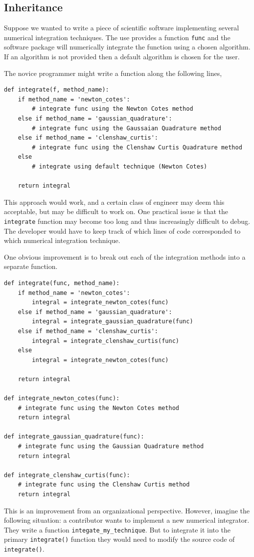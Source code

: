 \subsection{Inheritance}

Suppose we wanted to write a piece of scientific software implementing several
numerical integration techniques. The use provides a function {\tt func} and the
software package will numerically integrate the function using a chosen
algorithm. If an algorithm is not provided then a default algorithm is chosen
for the user.

The novice programmer might write a function along the following lines,
\begin{lstlisting}
def integrate(f, method_name):
    if method_name = 'newton_cotes':
        # integrate func using the Newton Cotes method
    else if method_name = 'gaussian_quadrature':
        # integrate func using the Gaussaian Quadrature method
    else if method_name = 'clenshaw_curtis':
        # integrate func using the Clenshaw Curtis Quadrature method
    else
        # integrate using default technique (Newton Cotes)

    return integral
\end{lstlisting}
This approach would work, and a certain class of engineer may deem this
acceptable, but may be difficult to work on. One practical issue is that the
{\tt integrate} function may become too long and thus increasingly difficult to
debug. The developer would have to keep track of which lines of code
corresponded to which numerical integration technique.

One obvious improvement is to break out each of the integration methods into a
separate function.
\begin{lstlisting}
def integrate(func, method_name):
    if method_name = 'newton_cotes':
        integral = integrate_newton_cotes(func)
    else if method_name = 'gaussian_quadrature':
        integral = integrate_gaussian_quadrature(func)
    else if method_name = 'clenshaw_curtis':
        integral = integrate_clenshaw_curtis(func)
    else
        integral = integrate_newton_cotes(func)

    return integral

def integrate_newton_cotes(func):
    # integrate func using the Newton Cotes method
    return integral
    
def integrate_gaussian_quadrature(func):
    # integrate func using the Gaussian Quadrature method
    return integral
    
def integrate_clenshaw_curtis(func):
    # integrate func using the Clenshaw Curtis method
    return integral
\end{lstlisting}
This is an improvement from an organizational perspective. However, imagine the
following situation: a contributor wants to implement a new numerical
integrator. They write a function \verb=integate_my_technique=. But to integrate
it into the primary {\tt integrate()} function they would need to modify the
source code of {\tt integrate()}.

